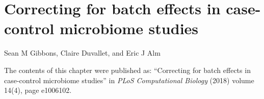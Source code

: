 
\graphicspath{{perc-norm/figures/}}

\chapter{Correcting for batch effects in case-control microbiome studies}\label{chap:perc-norm}

\noindent
Sean M Gibbons, Claire Duvallet, and Eric J Alm

\bigskip
\bigskip
\noindent
The contents of this chapter were published as: ``Correcting for batch effects in case-control microbiome studies'' in \textit{PLoS Computational Biology} (2018) volume 14(4), page e1006102.

\clearpage

